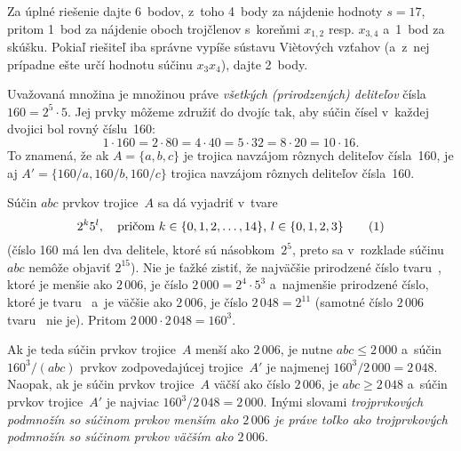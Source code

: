 {\nobreak\medskip\petit\noindent
Za úplné riešenie dajte 6~bodov, z~toho 4~body
za nájdenie hodnoty $s=17$, pritom 1~bod za nájdenie
oboch trojčlenov s~koreňmi $x_{1,2}$ resp. $x_{3,4}$
a~1~bod za skúšku. Pokiaľ
riešiteľ iba správne vypíše sústavu Vi\`etových vzťahov 
(a~z~nej prípadne ešte určí hodnotu súčinu $x_3x_4$), dajte
2~body.
\endpetit
\bigbreak
}

{%
Uvažovaná množina je množinou práve {\it všetkých (prirodzených)
deliteľov\/} čísla~$160=2^5\cdot5$. Jej prvky môžeme združiť do
dvojíc tak, aby súčin čísel v~každej dvojici bol rovný číslu~160:
$$
1\cdot160=2\cdot80=4\cdot40=5\cdot32=8\cdot20=10\cdot16.
$$
To znamená, že ak
$A = \{a, b, c\}$ je trojica navzájom rôznych deliteľov čísla~160,
je aj $A'=\{160/a,160/b,160/c\}$ trojica navzájom rôznych deliteľov
čísla~160.

Súčin $abc$ prvkov trojice~$A$ sa dá vyjadriť v~tvare
$$
2^k5^l,\quad \text{pričom $k\in\{0,1,2,\dots,14\}$, $l\in\{0,1,2,3\}$}
\tag1
$$
(číslo 160 má len dva delitele, ktoré sú násobkom~$2^5$, preto sa
v~rozklade súčinu $abc$ nemôže objaviť $2^{15}$).
Nie je ťažké zistiť, že najväčšie prirodzené číslo tvaru~, ktoré
je menšie ako $2\,006$, je číslo $2\,000 = 2^4\cdot5^3$ a~najmenšie
prirodzené číslo, ktoré je tvaru~ a~je väčšie ako $2\,006$, je
číslo $2\,048=2^{11}$ (samotné číslo $2\,006$ tvaru~ nie je).
Pritom $2\,000\cdot2\,048=160^3$.

Ak je teda súčin prvkov trojice~$A$ menší ako $2\,006$, je nutne
$abc\le2\,000$ a~súčin $160^3/(abc)$ prvkov zodpovedajúcej trojice~$A'$
je najmenej $160^3/2\,000=2\,048$. Naopak, ak je súčin prvkov
trojice~$A$ väčší ako číslo $2\,006$, je $abc\ge2\,048$ a~súčin
prvkov trojice~$A'$ je najviac $160^3/2\,048=2\,000$. Inými
slovami {\it trojprvkových podmnožín so súčinom prvkov menším ako
$2\,006$ je práve toľko ako trojprvkových podmnožín so súčinom
prvkov väčším ako $2\,006$}.

}
